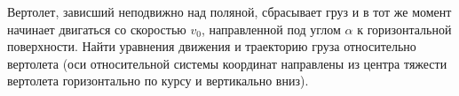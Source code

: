 Вертолет, зависший неподвижно над поляной, 
сбрасывает груз и в тот же момент 
начинает двигаться со скоростью
$v_{0}$, направленной под углом 
$\alpha$ к горизонтальной поверхности.
Найти уравнения движения и 
траекторию груза относительно вертолета 
(оси относительной системы 
координат направлены из центра 
тяжести вертолета
горизонтально по курсу и вертикально вниз).

